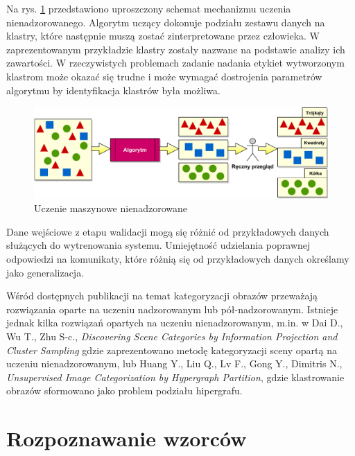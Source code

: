 Na rys. \ref{fig:unsupervised-learning} przedstawiono uproszczony schemat mechanizmu uczenia nienadzorowanego. Algorytm uczący dokonuje podziału zestawu danych na klastry, które następnie muszą zostać zinterpretowane przez człowieka. W zaprezentowanym przykładzie klastry zostały nazwane na podstawie analizy ich zawartości. W rzeczywistych problemach zadanie nadania etykiet wytworzonym klastrom może okazać się trudne i może wymagać dostrojenia parametrów algorytmu by identyfikacja klastrów była możliwa.

\begin{figure}[h]
	\centering
	\includegraphics[scale=0.77]{graphics/01_podstawy_teoretyczne/unsupervised-learning.pdf}
	\caption{Uczenie maszynowe nienadzorowane \cite{CASEY}}
	\label{fig:unsupervised-learning}
\end{figure}

Dane wejściowe z etapu walidacji mogą się różnić od przykładowych danych służących do wytrenowania systemu. Umiejętność udzielania poprawnej odpowiedzi na komunikaty, które różnią się od przykładowych danych określamy jako generalizacja.\cite{BISHOP06}

Wśród dostępnych publikacji na temat kategoryzacji obrazów przeważają rozwiązania oparte na uczeniu nadzorowanym lub pół-nadzorowanym.\cite{MELE06}\cite{CHEN04}\cite{Vitaladevuni13}\cite{LUO11} Istnieje jednak kilka rozwiązań opartych na uczeniu nienadzorowanym, m.in. w  Dai D., Wu T., Zhu S-c., \emph{Discovering Scene Categories by Information Projection and Cluster Sampling}\cite{DAI10} gdzie zaprezentowano metodę kategoryzacji sceny opartą na uczeniu nienadzorowanym, lub Huang Y., Liu Q., Lv F., Gong Y., Dimitris N., \emph{Unsupervised Image Categorization by Hypergraph Partition}\cite{HUANG11}, gdzie klastrowanie obrazów sformowano jako problem podziału hipergrafu.

\section{Rozpoznawanie wzorców}

